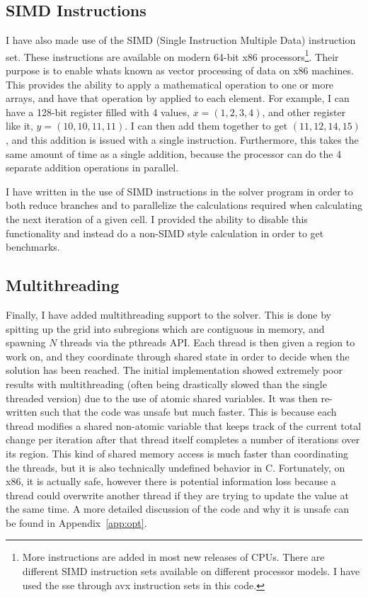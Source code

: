 \subsection{SIMD Instructions}
I have also made use of the SIMD (Single Instruction Multiple Data) instruction set. These instructions are available
on modern 64-bit x86 processors\footnote{More instructions are added in most new releases of CPUs. There are different
SIMD instruction sets available on different processor models. I have used the sse through avx instruction sets in this
code.}. Their purpose is to enable whats known as vector processing of data on x86 machines. This provides the ability
to apply a mathematical operation to one or more arrays, and have that operation by applied to each element. For example,
I can have a 128-bit register filled with 4 values, $x=(1,2,3,4)$, and other register like it, $y=(10, 10, 11, 11)$. I can
then add them together to get $(11, 12, 14, 15)$, and this addition is issued with a single instruction. Furthermore, this
takes the same amount of time as a single addition, because the processor can do the 4 separate addition operations in
parallel.

I have written in the use of SIMD instructions in the solver program in order to both reduce branches and to parallelize
the calculations required when calculating the next iteration of a given cell. I provided the ability to disable this
functionality and instead do a non-SIMD style calculation in order to get benchmarks.

\subsection{Multithreading}
Finally, I have added multithreading support to the solver. This is done by spitting up the grid into subregions which
are contiguous in memory, and spawning $N$ threads via the pthreads API. Each thread is then given a region to work on,
and they coordinate through shared state in order to decide when the solution has been reached. The initial implementation
showed extremely poor results with multithreading (often being drastically slowed than the single threaded version)
due to the use of atomic shared variables. It was then re-written such that the code was unsafe but much faster. This
is because each thread modifies a shared non-atomic variable that keeps track of the current total change per iteration
after that thread itself completes a number of iterations over its region. This kind of shared memory access is much faster
than coordinating the threads, but it is also technically undefined behavior in C. Fortunately, on x86, it is actually
safe, however there is potential information loss because a thread could overwrite another thread if they are trying to
update the value at the same time. A more detailed discussion of the code and why it is unsafe can be found in Appendix~\ref{app:opt}.

